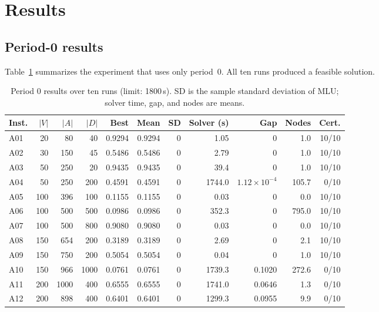 \section{Results}
\label{sec:results}

\subsection{Period-0 results}

Table~\ref{tab:t0} summarizes the experiment that uses only period~0. All ten runs produced a
feasible solution.

\begin{table}[h!]
\centering
\caption{Period 0 results over ten runs (limit: 1800\,s). SD is the sample standard deviation of MLU;
solver time, gap, and nodes are means.}
\label{tab:t0}
\renewcommand{\arraystretch}{1.1}
\footnotesize
\setlength{\tabcolsep}{4pt}
\begin{tabular}{@{}lrrrrrrrrrr@{}}
\toprule
\textbf{Inst.} & \textbf{$|V|$} & \textbf{$|A|$} & \textbf{$|D|$} & \textbf{Best} & \textbf{Mean} &
\textbf{SD} & \textbf{Solver (s)} & \textbf{Gap} & \textbf{Nodes} & \textbf{Cert.} \\
\midrule
A01 & 20 & 80 & 40 & 0.9294 & 0.9294 & 0 & 1.05 & 0 & 1.0 & 10/10 \\
A02 & 30 & 150 & 45 & 0.5486 & 0.5486 & 0 & 2.79 & 0 & 1.0 & 10/10 \\
A03 & 50 & 250 & 20 & 0.9435 & 0.9435 & 0 & 39.4 & 0 & 1.0 & 10/10 \\
A04 & 50 & 250 & 200 & 0.4591 & 0.4591 & 0 & 1744.0 & $1.12\times10^{-4}$ & 105.7 & 0/10 \\
A05 & 100 & 396 & 100 & 0.1155 & 0.1155 & 0 & 0.03 & 0 & 0.0 & 10/10 \\
A06 & 100 & 500 & 500 & 0.0986 & 0.0986 & 0 & 352.3 & 0 & 795.0 & 10/10 \\
A07 & 100 & 500 & 800 & 0.9080 & 0.9080 & 0 & 0.03 & 0 & 0.0 & 10/10 \\
A08 & 150 & 654 & 200 & 0.3189 & 0.3189 & 0 & 2.69 & 0 & 2.1 & 10/10 \\
A09 & 150 & 750 & 200 & 0.5054 & 0.5054 & 0 & 0.04 & 0 & 1.0 & 10/10 \\
A10 & 150 & 966 & 1000 & 0.0761 & 0.0761 & 0 & 1739.3 & 0.1020 & 272.6 & 0/10 \\
A11 & 200 & 1000 & 400 & 0.6555 & 0.6555 & 0 & 1741.0 & 0.0646 & 1.3 & 0/10 \\
A12 & 200 & 898 & 400 & 0.6401 & 0.6401 & 0 & 1299.3 & 0.0955 & 9.9 & 0/10 \\

\end{tabular}
\end{table}
